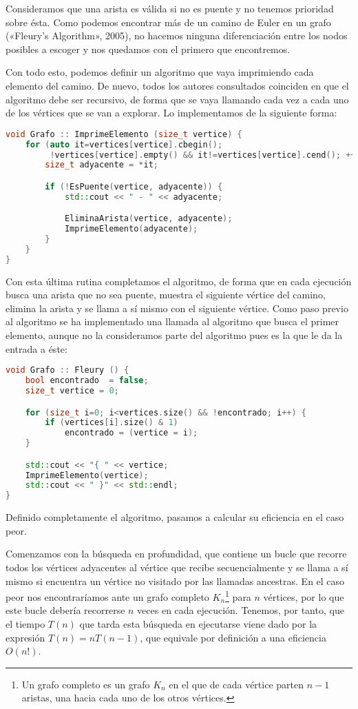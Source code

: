 Consideramos que una arista es válida si no es puente y no tenemos prioridad sobre ésta.
Como podemos encontrar más de un camino de Euler en un grafo («Fleury’s Algorithm», 2005), no hacemos ninguna diferenciación entre los nodos posibles a escoger y nos quedamos con el primero que encontremos.

Con todo esto, podemos definir un algoritmo que vaya imprimiendo cada elemento del camino.
De nuevo, todos los autores consultados coinciden en que el algoritmo debe ser recursivo, de forma que se vaya llamando cada vez a cada uno de los vértices que se van a explorar.
Lo implementamos de la siguiente forma:

\begin{lstlisting}[language=C++]
void Grafo :: ImprimeElemento (size_t vertice) {
	for (auto it=vertices[vertice].cbegin();
	     !vertices[vertice].empty() && it!=vertices[vertice].cend(); ++it) {
		size_t adyacente = *it;

		if (!EsPuente(vertice, adyacente)) {
			std::cout << " - " << adyacente;

			EliminaArista(vertice, adyacente);
			ImprimeElemento(adyacente);
		}
	}
}
\end{lstlisting}

Con esta última rutina completamos el algoritmo, de forma que en cada ejecución busca una arista que no sea puente, muestra el siguiente vértice del camino, elimina la arista y se llama a sí mismo con el siguiente vértice.
Como paso previo al algoritmo se ha implementado una llamada al algoritmo que busca el primer elemento, aunque no la consideramos parte del algoritmo pues es la que le da la entrada a éste:

\pagebreak

\begin{lstlisting}[language=C++]
void Grafo :: Fleury () {
	bool encontrado  = false;
	size_t vertice = 0;

	for (size_t i=0; i<vertices.size() && !encontrado; i++) {
		if (vertices[i].size() & 1)
			encontrado = (vertice = i);
	}

	std::cout << "{ " << vertice;
	ImprimeElemento(vertice);
	std::cout << " }" << std::endl;
}
\end{lstlisting}

Definido completamente el algoritmo, pasamos a calcular su eficiencia en el caso peor.

Comenzamos con la búsqueda en profundidad, que contiene un bucle  que recorre todos los vértices adyacentes al vértice que recibe secuencialmente y se llama a sí mismo si encuentra un vértice no visitado por las llamadas ancestras.
En el caso peor nos encontraríamos ante un grafo completo $K_n$\footnote{%
	Un grafo completo es un grafo $K_n$ en el que de cada vértice parten $n-1$ aristas, una hacia cada uno de los otros vértices.
} para $n$ vértices, por lo que este bucle debería recorrerse $n$ veces en cada ejecución.
Tenemos, por tanto, que el tiempo $T(n)$ que tarda esta búsqueda en ejecutarse viene dado por la expresión $T(n)=nT(n-1)$, que equivale por definición a una eficiencia $O(n!)$.

